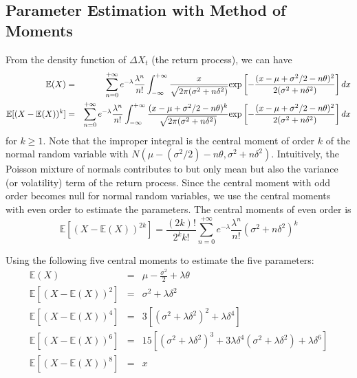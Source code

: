 \documentclass[11pt,reqno,final]{amsart}
\def\exp{\hbox{\rm exp}}
\begin{document}
\subsection{Parameter Estimation with Method of Moments}
From the density function of $\Delta X_t$ (the return process), we can have
\begin{eqnarray*}
\mathbb{E}(X) &=& \sum_{n=0}^{+\infty} e^{-\lambda}\frac{\lambda^n}{n!} \int_{-\infty}^{+\infty} \frac{x}{\sqrt{2\pi(\sigma^2+n\delta^2)}} \exp\left[ -\frac{(x-\mu+\sigma^2/2 -n\theta)^2}{2(\sigma^2+n\delta^2)} \right] dx \\
\mathbb{E}[(X-\mathbb{E}(X))^k] &=& \sum_{n=0}^{+\infty} e^{-\lambda}\frac{\lambda^n}{n!} \int_{-\infty}^{+\infty} \frac{(x-\mu+\sigma^2/2 -n\theta)^k}{\sqrt{2\pi(\sigma^2+n\delta^2)}} \exp\left[ -\frac{(x-\mu+\sigma^2/2 -n\theta)^2}{2(\sigma^2+n\delta^2)} \right] dx \\
\end{eqnarray*}
for $k\geq 1$. Note that the improper integral is the central moment of order $k$ of the normal random variable with $N(\mu-(\sigma^2/2)-n\theta, \sigma^2+n\delta^2)$. Intuitively, the Poisson mixture of normals contributes to but only mean but also the variance (or volatility) term of the return process. Since the central moment with odd order becomes null for normal random variables, we use the central moments with even order to estimate the parameters. The central moments of even order is
$$
\mathbb{E}[(X-\mathbb{E}(X))^{2k}] = \frac{(2k)!}{2^k k!} \sum_{n=0}^{+\infty} e^{-\lambda}\frac{\lambda^n}{n!} (\sigma^2 + n\delta^2)^k
$$

Using the following five central moments to estimate the five parameters:
\begin{eqnarray*}
\mathbb{E}(X)                       &=& \mu - \frac{\sigma^2}{2} + \lambda\theta \\
\mathbb{E}[(X-\mathbb{E}(X))^{2}]   &=& \sigma^2 + \lambda\delta^2 \\
\mathbb{E}[(X-\mathbb{E}(X))^{4}]   &=& 3[(\sigma^2+\lambda\delta^2)^2+\lambda\delta^4] \\
\mathbb{E}[(X-\mathbb{E}(X))^{6}]   &=& 15[(\sigma^2+\lambda\delta^2)^3 + 3\lambda\delta^4(\sigma^2+\lambda\delta^2)+\lambda\delta^6] \\
\mathbb{E}[(X-\mathbb{E}(X))^{8}]   &=& x
\end{eqnarray*}

\end{document}
